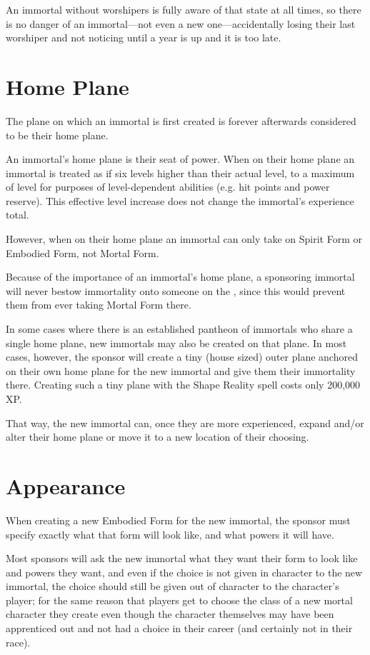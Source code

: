 \begin{multicols*}{2}
An immortal without worshipers is fully aware of that state at all times, so there is no danger of an immortal—not even a new one—accidentally losing their last worshiper and not noticing until a year is up and it is too late.

\section{Home Plane}
The plane on which an immortal is first created is forever afterwards considered to be their home plane.

An immortal’s home plane is their seat of power. When on their home plane an immortal is treated as if six levels higher than their actual level, to a maximum of  level for purposes of level-dependent abilities (e.g. hit points and power reserve). This effective level increase does not change the immortal’s experience total.

However, when on their home plane an immortal can only take on Spirit Form or Embodied Form, not Mortal Form.

Because of the importance of an immortal’s home plane, a sponsoring immortal will never bestow immortality onto someone on the , since this would prevent them from ever taking Mortal Form there.

In some cases where there is an established pantheon of immortals who share a single home plane, new immortals may also be created on that plane. In most cases, however, the sponsor will create a tiny (house sized) outer plane anchored on their own home plane for the new immortal and give them their immortality there. Creating such a tiny plane with the Shape Reality spell costs only 200,000 XP.

That way, the new immortal can, once they are more experienced, expand and/or alter their home plane or move it to a new location of their choosing.

\section{Appearance}
When creating a new Embodied Form for the new immortal, the sponsor must specify exactly what that form will look like, and what powers it will have.

Most sponsors will ask the new immortal what they want their form to look like and powers they want, and even if the choice is not given in character to the new immortal, the choice should still be given out of character to the character’s player; for the same reason that players get to choose the class of a new mortal character they create even though the character themselves may have been apprenticed out and not had a choice in their career (and certainly not in their race).


\end{multicols*}
